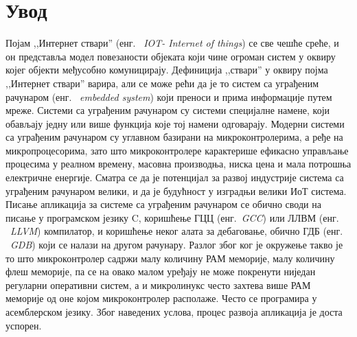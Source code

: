 \documentclass[12pt,oneside]{memoir}
\begin{document}
\frontmatter
\naslovna
\komisija
\apstrakt
\tableofcontents*

\mainmatter

\chapter{Увод}
Појам ,,Интернет ствари'' (енг. ~\textit{IOT- Internet of things}) се све чешће среће, и он представља модел повезаности објеката који чине огроман систем у оквиру којег објекти међусобно комуницирају. Дефиниција ,,ствари'' у оквиру појма ,,Интернет ствари'' варира, али се може рећи да је то систем са уграђеним рачунаром (енг. ~\textit{embedded system}) који преноси и прима информације путем мреже. Системи са уграђеним рачунаром су системи специјалне намене, који обављају једну или више функција које тој намени одговарају. Модерни системи са уграђеним рачунаром су углавном базирани на микроконтролерима, а ређе на микропроцесорима, зато што микроконтролере карактерише ефикасно управљање процесима у реалном времену, масовна производња, ниска цена и мала потрошња електричне енергије. Сматра се да је потенцијал за развој индустрије система са уграђеним рачунаром велики, и да је будућност у изградњи велики ИоТ система.\\

Писање апликација за системе са уграђеним рачунаром се обично своди на писање у програмском језику C, коришћење ГЦЦ (енг.~\textit{GCC}) или ЛЛВМ (енг. ~\textit{LLVM}) компилатор, и коришћење неког алата за дебаговање, обично ГДБ (енг. ~\textit{GDB}) који се налази на другом рачунару. Разлог због ког је окружење такво је то што микроконтролер садржи малу количину РАМ меморије, малу количину флеш меморије, па се на овако малом уређају не може покренути ниједан регуларни оперативни систем, а и микролинукс често захтева више РАМ меморије од оне којом микроконтролер располаже. Често се програмира у асемблерском језику. Због наведених услова, процес развоја апликација је доста успорен. 
\end{document}
